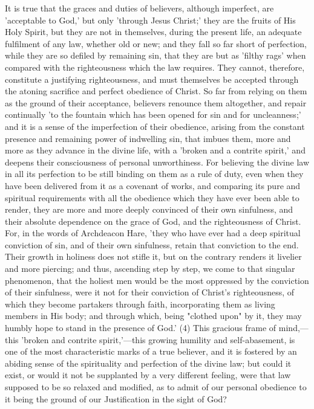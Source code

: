 \documentclass[
]{book}
\begin{document}
It is true that the graces and duties of believers, although imperfect, are 'acceptable to God,' but only 'through Jesus Christ;' they are the fruits of His Holy Spirit, but they are not in themselves, during the present life, an adequate fulfilment of any law, whether old or new; and they fall so far short of perfection, while they are so defiled by remaining sin, that they are but as 'filthy rags' when compared with the righteousness which the law requires. They cannot, therefore, constitute a justifying righteousness, and must themselves be accepted through the atoning sacrifice and perfect obedience of Christ. So far from relying on them as the ground of their acceptance, believers renounce them altogether, and repair continually 'to the fountain which has been opened for sin and for uncleanness;' and it is a sense of the imperfection of their obedience, arising from the constant presence and remaining power of indwelling sin, that imbues them, more and more as they advance in the divine life, with a 'broken and a contrite spirit,' and deepens their consciousness of personal unworthiness. For believing the divine law in all its perfection to be still binding on them as a rule of duty, even when they have been delivered from it as a covenant of works, and comparing its pure and spiritual requirements with all the obedience which they have ever been able to render, they are more and more deeply convinced of their own sinfulness, and their absolute dependence on the grace of God, and the righteousness of Christ. For, in the words of Archdeacon Hare, 'they who have ever had a deep spiritual conviction of sin, and of their own sinfulness, retain that conviction to the end. Their growth in holiness does not stifle it, but on the contrary renders it livelier and more piercing; and thus, ascending step by step, we come to that singular phenomenon, that the holiest men would be the most oppressed by the conviction of their sinfulness, were it not for their conviction of Christ's righteousness, of which they become partakers through faith, incorporating them as living members in His body; and through which, being "clothed upon" by it, they may humbly hope to stand in the presence of God.' (4) This gracious frame of mind,---this 'broken and contrite spirit,'---this growing humility and self-abasement, is one of the most characteristic marks of a true believer, and it is fostered by an abiding sense of the spirituality and perfection of the divine law; but could it exist, or would it not be supplanted by a very different feeling, were that law supposed to be so relaxed and modified, as to admit of our personal obedience to it being the ground of our Justification in the sight of God?
\end{document}

